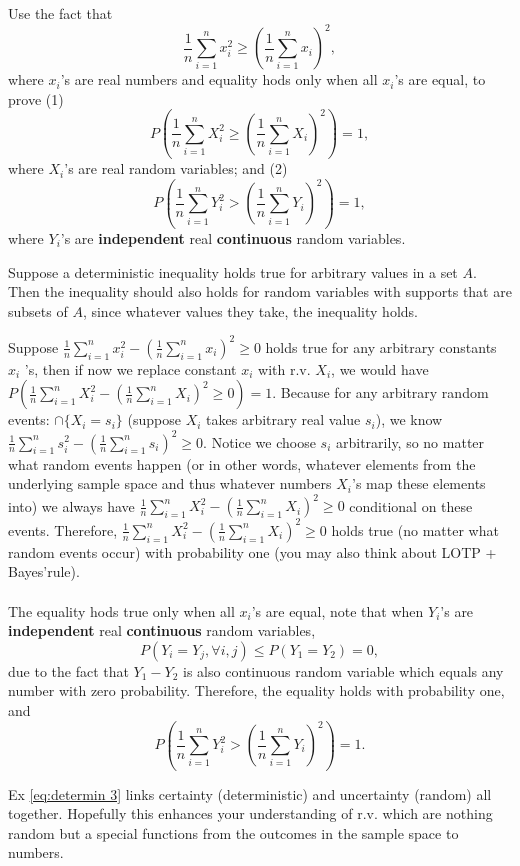  \begin{exercise}\label{eq:determin 3}
	Use the fact that  
	$$\frac{1}{n}\sum_{i=1}^n x_i^2 \geq \left(\frac{1}{n}\sum_{i=1}^n x_i \right)^2,$$
	where $x_i$'s are real numbers and equality hods only when all $x_i$'s are equal, to prove (1) 
	$$P\left(\frac{1}{n}\sum_{i=1}^n X_i^2 \geq \left(\frac{1}{n}\sum_{i=1}^n X_i \right)^2\right)=1,$$
	where $X_i$'s are real random variables; and (2)
	$$P\left(\frac{1}{n}\sum_{i=1}^n Y_i^2 > \left(\frac{1}{n}\sum_{i=1}^n Y_i \right)^2\right)=1,$$
	where $Y_i$'s are \textbf{independent} real \textbf{continuous} random variables. 	
	\begin{hint}
		Suppose a deterministic inequality holds true for arbitrary values in a set $A$. Then the inequality should also holds for random variables with supports that are subsets of $A$, since whatever values they take, the inequality holds.  
	\end{hint}
	\begin{solution} 
		Suppose $\frac{1}{n}\sum_{i=1}^n  x_i^2  -  ( \frac{1}{n}\sum_{i=1}^n  x_i )^2 \geq 0$  holds true for any arbitrary constants $x_i$ 's, then if now we replace constant $x_i$ with r.v. $X_i$, we would have $P\left(\frac{1}{n}\sum_{i=1}^n  X_i^2  -  ( \frac{1}{n}\sum_{i=1}^n  X_i )^2 \geq 0 \right)=1$.
		Because for any arbitrary random events: $\cap \{X_i=s_i\}$ (suppose $X_i$ takes arbitrary real value $s_i$), we know $\frac{1}{n}\sum_{i=1}^n  s_i^2  -  ( \frac{1}{n}\sum_{i=1}^n  s_i )^2 \geq 0$. Notice we choose $s_i$ arbitrarily, so no matter what random events happen (or in other words, whatever elements from the underlying sample space and thus whatever numbers $X_i$'s map these elements into) we always have $\frac{1}{n}\sum_{i=1}^n  X_i^2  -  ( \frac{1}{n}\sum_{i=1}^n  X_i )^2 \geq 0$ conditional on these events.  Therefore, $\frac{1}{n}\sum_{i=1}^n  X_i^2  -  ( \frac{1}{n}\sum_{i=1}^n  X_i )^2 \geq 0$ holds true (no matter what random events occur) with probability one (you may also think about LOTP + Bayes'rule). \\~\\
		The equality hods true only when  all $x_i$'s are equal, note that when $Y_i$'s are \textbf{independent} real \textbf{continuous} random variables,
			$$P\left( Y_i=Y_j, \forall i,j \right)\leq P\left( Y_1=Y_2\right)=0,$$
			due to the fact that $Y_1-Y_2$ is also continuous random variable which equals any number with zero probability. 
		Therefore, the equality holds with probability one, and	
		$$P\left(\frac{1}{n}\sum_{i=1}^n Y_i^2 > \left(\frac{1}{n}\sum_{i=1}^n Y_i \right)^2\right)=1.$$
	\end{solution}
\end{exercise}
\begin{remark}
 Ex \ref{eq:determin 3}	links certainty (deterministic) and uncertainty (random) all together. Hopefully this enhances your understanding of r.v. which are nothing random but a special functions from the outcomes in the sample space to numbers.
\end{remark}

